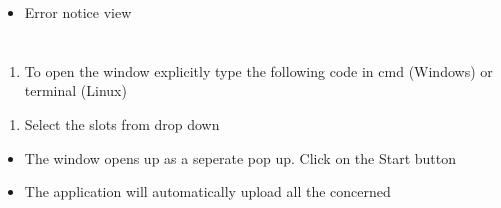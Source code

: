 \documentclass[letterpaper,10pt,english]{sphinxmanual}
\begin{document}
\begin{itemize}
\item {} 
Error notice view

\end{itemize}



\section{}
\label{\detokenize{user_manual:working-in-gui-2}}

\subsection{}
\label{\detokenize{user_manual:id2}}
\begin{enumerate}
%
\item {} 
To open the window explicitly type the following code in cmd (Windows) or terminal (Linux)

\end{enumerate}

\begin{sphinxVerbatim}[commandchars=\\\{\}]
 
\end{sphinxVerbatim}
\begin{enumerate}
%
\setcounter{enumi}{1}
\item {} 
Select the slots from drop down

\end{enumerate}
\begin{itemize}
\item {} 
The window opens up as a seperate pop up. Click on the Start button

\end{itemize}

\begin{itemize}
\item {} 
The application will automatically upload all the concerned

\end{itemize}
\end{document}
